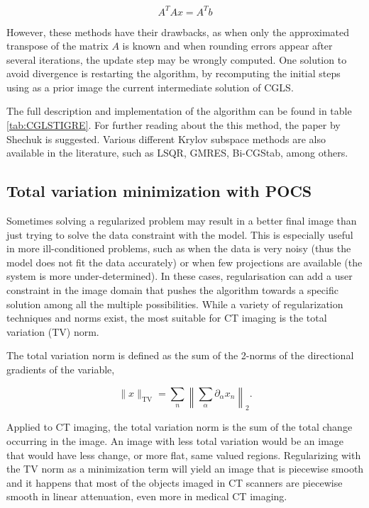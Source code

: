 \begin{equation}
A^TAx=A^Tb \label{eq:normaleq}
\end{equation}

However, these methods have their drawbacks, as when only the approximated transpose of the matrix $A$ is known and when rounding errors appear after several iterations, the update step may be wrongly computed. One solution to avoid divergence is restarting the algorithm, by recomputing the initial steps using as a prior image the current intermediate solution of CGLS.

The full description and implementation of the algorithm can be found in table \ref{tab:CGLSTIGRE}. For further reading about the this method, the paper by Shechuk is suggested\cite{shewchuk1994introduction}. Various different Krylov subspace methods are also available in the literature, such as LSQR\cite{qiu2012blockwise}, GMRES\cite{GMRES}, Bi-CGStab\cite{van1992bi}, among others.
\subsection{Total variation minimization with POCS}

Sometimes solving a regularized problem may result in a better final image than just trying to solve the data constraint with the model. This is especially useful in more ill-conditioned problems, such as when the data is very noisy (thus the model does not fit the data accurately) or when few projections are available (the system is more under-determined). In these cases, regularisation can add a user constraint in the image domain that pushes the algorithm towards a specific solution among all the multiple possibilities. While a variety of regularization techniques and norms exist, the most suitable for CT imaging is the total variation (TV) norm.

The total variation norm is defined as the sum of the 2-norms of the directional gradients of the variable,

\begin{equation}
\lVert x \rVert_\text{TV}=\sum_n\left\lVert \sum_\alpha\partial_\alpha x_n \right\rVert_2.
\end{equation}

Applied to CT imaging, the total variation norm is the sum of the total change occurring in the image. An image with less total variation would be an image that would have less change, or more flat, same valued regions. Regularizing with the TV norm as a minimization term will yield an image that is piecewise smooth and it happens that most of the objects imaged in CT scanners are piecewise smooth in linear attenuation, even more in medical CT imaging. 

